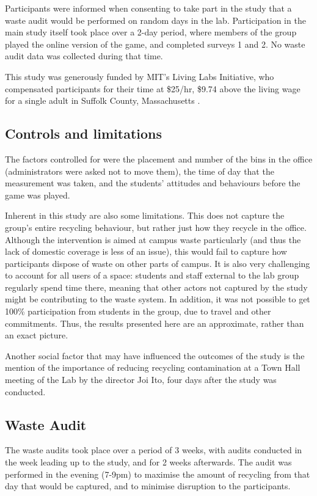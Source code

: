 \documentclass[nofonts,nols,justified,nobib]{tufte-book}
\begin{document}
Participants were informed when consenting to take part in the study that a waste audit would be performed on random days in the lab. Participation in the main study itself took place over a 2-day period, where members of the group played the online version of the game, and completed surveys 1 and 2. No waste audit data was collected during that time.

This study was generously funded by MIT's Living Labs Initiative, who compensated participants for their time at \$25/hr, \$9.74 above the living wage for a single adult in Suffolk County, Massachusetts \cite{glasmeier_mit_2018}.

\subsection*{Controls and limitations}
The factors controlled for were the placement and number of the bins in the office (administrators were asked not to move them), the time of day that the measurement was taken, and the students' attitudes and behaviours before the game was played.

Inherent in this study are also some limitations. This does not capture the group's entire recycling behaviour, but rather just how they recycle in the office. Although the intervention is aimed at campus waste particularly (and thus the lack of domestic coverage is less of an issue), this would fail to capture how participants dispose of waste on other parts of campus. It is also very challenging to account for all users of a space: students and staff external to the lab group regularly spend time there, meaning that other actors not captured by the study might be contributing to the waste system. In addition, it was not possible to get 100\% participation from students in the group, due to travel and other commitments. Thus, the results presented here are an approximate, rather than an exact picture.

Another social factor that may have influenced the outcomes of the study is the mention of the importance of reducing recycling contamination at a Town Hall meeting of the Lab by the director Joi Ito, four days after the study was conducted.

\subsection*{Waste Audit}
The waste audits took place over a period of 3 weeks, with audits conducted in the week leading up to the study, and for 2 weeks afterwards. The audit was performed in the evening (7-9pm) to maximise the amount of recycling from that day that would be captured, and to minimise disruption to the participants.
\end{document}

